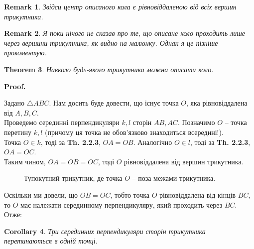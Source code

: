 \documentclass[a4paper, 10pt]{article}
\makeatletter
\theoremstyle{theoremdd}
\newtheorem{theorem}{Theorem}[subsection]
\theoremstyle{theoremdd}
\theoremstyle{theoremdd}
\theoremstyle{theoremdd}
\theoremstyle{theoremdd}
\theoremstyle{theoremdd}
\theoremstyle{theoremdd}
\newtheorem{remark}[theorem]{Remark}
\theoremstyle{theoremdd}
\theoremstyle{theoremdd}
\newtheorem{corollary}[theorem]{Corollary}
\renewenvironment{proof}[1][Proof.\\]{\par
\pushQED{\hfill \qed}%
\normalfont \topsep6\p@\@plus6\p@\relax
\trivlist
\item\relax
{\bfseries
#1\@addpunct{.}}\hspace\labelsep\ignorespaces
}{%
\popQED\endtrivlist\@endpefalse
}
\makeatother
\begin{document}
\begin{remark}
Звідси центр описаного кола є рівновіддаленою від всіх вершин трикутника.
\end{remark}

\begin{remark}
Я поки нічого не сказав про те, що описане коло проходить \textit{лише} через вершини трикутника, як видно на малюнку. Однак я це пізніше прокоментую.
\end{remark}

\begin{theorem}
Навколо будь-якого трикутника можна описати коло.
\end{theorem}

\begin{proof}
Задано $\triangle ABC$. Нам досить буде довести, що існує точка $O$, яка рівновіддалена від $A,B,C$.\\
Проведемо серединні перпендикуляри $k,l$ сторін $AB,AC$. Позначимо $O$ -- точка перетину $k,l$ (причому ця точка не обов'язково знаходиться всередині!).\\
Точка $O \in k$, тоді за \textbf{Th. 2.2.3}, $OA = OB$. Аналогічно $O \in l$, тоді за \textbf{Th. 2.2.3}, $OA = OC$.\\
Таким чином, $OA = OB = OC$, тоді $O$ рівновіддалена від вершин трикутника.
\begin{figure}[H]
\centering
{}
\caption*{Тупокутний трикутник, де точка $O$ -- поза межами трикутника. \qedhere}
\end{figure}
\end{proof}

Оскільки ми довели, що $OB = OC$, тобто точка $O$ рівновіддалена від кінців $BC$, то $O$ має належати серединному перпендикуляру, який проходить через $BC$. Отже:

\begin{corollary}
Три серединних перпендикуляри сторін трикутника перетинаються в одній точці.
\end{corollary}
\end{document}
